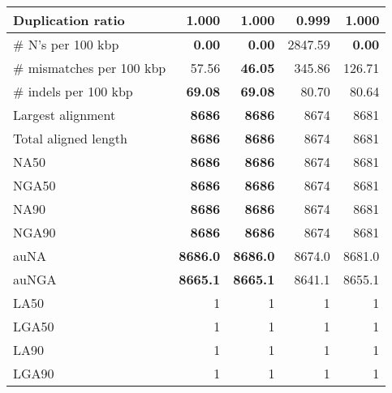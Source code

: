 \documentclass[12pt,a4paper]{article}
\begin{document}
\begin{table}[ht]
\begin{center}
\begin{tabular}{|l*{4}{|r}|}
Duplication ratio & 1.000 & 1.000 & {\bf 0.999} & 1.000 \\ \hline
\# N's per 100 kbp & {\bf 0.00} & {\bf 0.00} & 2847.59 & {\bf 0.00} \\ \hline
\# mismatches per 100 kbp & 57.56 & {\bf 46.05} & 345.86 & 126.71 \\ \hline
\# indels per 100 kbp & {\bf 69.08} & {\bf 69.08} & 80.70 & 80.64 \\ \hline
Largest alignment & {\bf 8686} & {\bf 8686} & 8674 & 8681 \\ \hline
Total aligned length & {\bf 8686} & {\bf 8686} & 8674 & 8681 \\ \hline
NA50 & {\bf 8686} & {\bf 8686} & 8674 & 8681 \\ \hline
NGA50 & {\bf 8686} & {\bf 8686} & 8674 & 8681 \\ \hline
NA90 & {\bf 8686} & {\bf 8686} & 8674 & 8681 \\ \hline
NGA90 & {\bf 8686} & {\bf 8686} & 8674 & 8681 \\ \hline
auNA & {\bf 8686.0} & {\bf 8686.0} & 8674.0 & 8681.0 \\ \hline
auNGA & {\bf 8665.1} & {\bf 8665.1} & 8641.1 & 8655.1 \\ \hline
LA50 & 1 & 1 & 1 & 1 \\ \hline
LGA50 & 1 & 1 & 1 & 1 \\ \hline
LA90 & 1 & 1 & 1 & 1 \\ \hline
LGA90 & 1 & 1 & 1 & 1 \\ \hline
\end{tabular}
\end{center}
\end{table}
\end{document}
